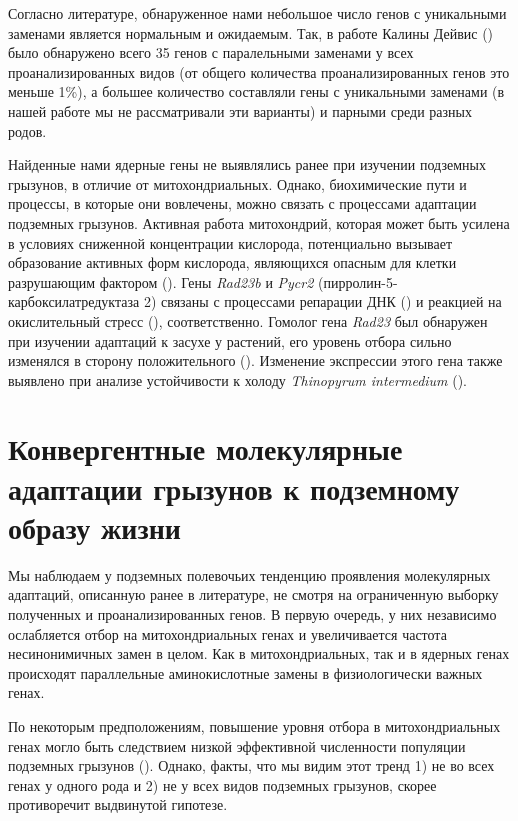 Согласно литературе, обнаруженное нами небольшое число генов с уникальными заменами  является нормальным и ожидаемым. Так, в работе Калины Дейвис (\cite{Davies2018}) было обнаружено всего 35 генов с паралельными заменами у всех проанализированных видов (от общего количества проанализированных генов это меньше 1\%), а большее количество составляли гены с уникальными заменами (в нашей работе мы не рассматривали эти варианты) и парными среди разных родов. 

Найденные нами ядерные гены не выявлялись ранее при изучении подземных грызунов, в отличие от митохондриальных. Однако, биохимические пути и процессы, в которые они вовлечены, можно связать с процессами адаптации подземных грызунов. Активная работа митохондрий, которая может быть усилена в условиях сниженной концентрации кислорода, потенциально вызывает образование активных форм кислорода, являющихся опасным для клетки разрушающим фактором (\cite{Turrens2003}). Гены \textit{Rad23b} и \textit{Pycr2} (пирролин-5-карбоксилатредуктаза 2) связаны с процессами репарации ДНК (\cite{Pohjoismaki2012}) и реакцией на окислительный стресс (\cite{Kuo2015}), соответственно. Гомолог гена \textit{Rad23} был обнаружен при изучении адаптаций к засухе у растений, его уровень отбора сильно изменялся в сторону положительного (\cite{Zhang2013b}). Изменение экспрессии этого гена также выявлено при анализе устойчивости к холоду \textit{Thinopyrum intermedium} (\cite{Jaikumar2020}).   
       

\section{Конвергентные молекулярные адаптации грызунов к подземному образу жизни}

Мы наблюдаем у подземных полевочьих тенденцию проявления молекулярных адаптаций, описанную ранее в литературе, не смотря на ограниченную выборку полученных и проанализированных генов. В первую очередь, у них независимо ослабляется отбор на митохондриальных генах и увеличивается частота несинонимичных замен в целом. Как в митохондриальных, так и в ядерных генах происходят параллельные аминокислотные замены в физиологически важных генах. 


По некоторым предположениям, повышение уровня отбора в митохондриальных генах могло быть следствием низкой эффективной численности популяции подземных грызунов (\cite{Lacey2000}). Однако, факты, что мы видим этот тренд 1) не во всех генах у одного рода и 2) не у всех видов подземных грызунов, скорее противоречит выдвинутой гипотезе. 

